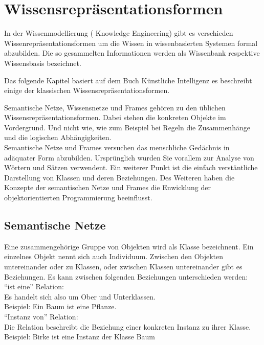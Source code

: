 \chapter{Wissensrepräsentationsformen}
\label{chap:wissensrepFormen}


In der Wissenmodellierung ( Knowledge Engineering) gibt es verschieden Wissenrepräsentationsformen um die Wissen in wissenbasierten Systemen formal abzubilden. Die so gesammelten Informationen werden als Wissenbank respektive Wissensbasis bezeichnet.~\cite{wikiWissensrep}

Das folgende Kapitel basiert auf dem Buch Künstliche Intelligenz\cite{laemmel} es beschreibt einige der klassischen Wissensrepräsentationsformen.

Semantische Netze, Wissensnetze und Frames gehören zu den üblichen Wissensrepräsentationsformen. Dabei stehen die konkreten Objekte im Vordergrund. Und nicht wie, wie zum Beispiel bei Regeln die Zusammenhänge und die logischen Abhängigkeiten.\\

Semantische Netze und Frames versuchen das menschliche Gedächnis in adäquater Form abzubilden. Ursprünglich wurden Sie vorallem zur Analyse von Wörtern und Sätzen verwendent. Ein weiterer Punkt ist die einfach verstäntliche Darstellung von Klassen und deren Beziehungen. Des Weiteren haben die Konzepte der semantischen Netze und Frames die Enwicklung der objektorientierten Programmierung beeinflusst.

\section{Semantische Netze}
\label{sec:wissensrepFormen_semantischeNetze}

Eine zusammengehörige Gruppe von Objekten wird als Klasse bezeichnent. Ein einzelnes Objekt nennt sich auch Individuum. Zwischen den Objekten untereinander oder zu Klassen, oder zwischen Klassen untereinander gibt es Beziehungen. Es kann zwischen folgenden Beziehungen unterschieden werden:\\

"`ist eine"' Relation: \\
\noindent\hspace*{15mm} Es handelt sich also um Ober und Unterklassen.\\ 
\noindent\hspace*{15mm} Beispiel: Ein Baum ist eine Pflanze.\\

"`Instanz von"' Relation:\\
\noindent\hspace*{15mm} Die Relation beschreibt die Beziehung einer konkreten Instanz zu ihrer Klasse.\\
\noindent\hspace*{15mm} Beispiel: Birke ist eine Instanz der Klasse Baum\\

